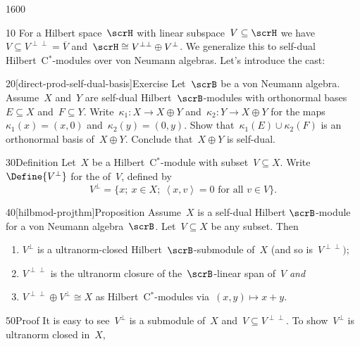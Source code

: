 \begin{parsec}{1600}%
\begin{point}{10}%
For a Hilbert space~$\scrH$
    with linear subspace~$V \subseteq \scrH$
    we have~$V \subseteq V^{\perp\perp} = \overline{V}$
    and~$\scrH \cong V^{\perp\perp} \oplus  V^\perp$.
We generalize this to self-dual Hilbert~C$^*$-modules
    over von Neumann algebras.
Let's introduce the cast:
\end{point}
\begin{point}{20}[direct-prod-self-dual-basis]{Exercise}%
Let~$\scrB$ be a von Neumann algebra.
Assume~$X$ and~$Y$ are self-dual Hilbert~$\scrB$-modules
    with orthonormal bases~$E \subseteq X$ and~$F \subseteq Y$.
Write~$\kappa_1\colon X \to X \oplus Y$
    and~$\kappa_2 \colon Y \to X \oplus Y$
    for the maps~$\kappa_1(x) = (x,0)$ and~$\kappa_2(y) = (0, y)$.
Show that~$\kappa_1(E) \cup \kappa_2(F)$
    is an orthonormal basis of~$X \oplus Y$.
    Conclude that~$X \oplus Y$ is self-dual.
\end{point}
\begin{point}{30}{Definition}%
Let~$X$ be a Hilbert~C$^*$-module
    with subset~$V \subseteq X$.
    Write~$\Define{V^\perp}$ for the 
    of~$V$, defined by
\begin{equation*}
    V^\perp = \{ x; \ x \in X;\ \left<x,v\right>=0\text{ for all }v\in V\}.
\end{equation*}
\end{point}
\spacingfix{}
\begin{point}{40}[hilbmod-projthm]{Proposition}%
Assume~$X$ is a self-dual Hilbert $\scrB$-module
    for a von Neumann algebra~$\scrB$.
Let~$V \subseteq X$ be any subset. Then
\begin{enumerate}
\item
$V^\perp$ is a ultranorm-closed Hilbert~$\scrB$-submodule of~$X$
    (and so is~$V^{\perp\perp})$;
\item
    $V^{\perp\perp}$ is the ultranorm closure of the~$\scrB$-linear
    span of~$V$ \emph{and}
\item
    $V^{\perp\perp} \oplus V^\perp \cong X$ as Hilbert~C$^*$-modules
        via~$(x,y) \mapsto x+y$.
\end{enumerate}
\spacingfix{}
\begin{point}{50}{Proof}%
It is easy to see~$V^\perp$ is a submodule of~$X$
    and~$V \subseteq V^{\perp\perp}$.
To show~$V^\perp$ is ultranorm closed in~$X$,

\end{point}
\end{point}
\end{parsec}
